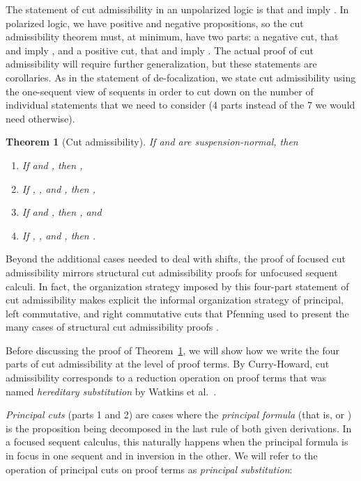 \documentclass[acmtocl]{robtrans}\pdfoutput=1
\newtheorem{theorem}{Theorem}
\begin{document}
The statement of cut admissibility in an unpolarized logic is that
 and  imply . In
polarized logic, we have positive and negative propositions, so the
cut admissibility theorem must, at minimum, have two parts: a negative
cut, that  and  imply , and a positive cut,
that  and  imply
. The actual proof of cut admissibility will
require further generalization, but these statements are corollaries.
As in the statement of de-focalization, we state cut admissibility
using the one-sequent view of sequents in order to cut down on the
number of individual statements that we need to consider (4 parts
instead of the 7 we would need otherwise).

\begin{theorem}[Cut admissibility]
If  and  are suspension-normal, then\label{thm:cut}

\begin{enumerate}
\item If  and , then
      ,
\item If , , 
      and , then
      ,
\item If  and , then 
      , and
\item If , ,
      and ,
      then .
\end{enumerate}
\end{theorem}

\noindent
Beyond the additional cases needed to deal with shifts, the proof of
focused cut admissibility mirrors structural cut admissibility proofs
for unfocused sequent calculi.  In fact, the organization strategy
imposed by this four-part statement of cut admissibility makes
explicit the informal organization strategy of principal, 
left commutative, and right commutative cuts that Pfenning used to
present the many cases of structural cut admissibility proofs
\cite{pfenning00structural}.  

Before discussing the proof of Theorem~\ref{thm:cut}, we will show how
we write the four parts of cut admissibility at the level of proof
terms. By Curry-Howard, cut admissibility corresponds to a reduction
operation on proof terms that was named {\it hereditary substitution}
by Watkins et al.~.

{\it Principal cuts} (parts 1 and 2) are cases where the {\it
  principal formula} (that is,  or ) is the proposition
being decomposed in the last rule of both given derivations. In a
focused sequent calculus, this naturally happens when the principal
formula is in focus in one sequent and in inversion in the other. We
will refer to the operation of principal cuts on proof terms as {\it
  principal substitution}:
\end{document}

